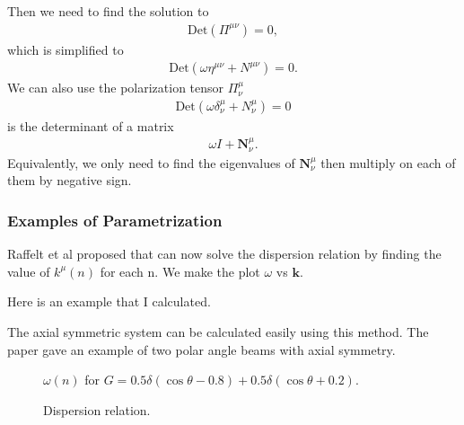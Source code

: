 \documentclass[letterpaper,12pt,english]{sphinxmanual}
\begin{document}
Then we need to find the solution to
\begin{equation*}
\begin{split}\mathrm{Det}(\Pi^{\mu\nu})=0,\end{split}
\end{equation*}
which is simplified to
\begin{equation*}
\begin{split}\mathrm{Det}(\omega \eta^{\mu\nu} + N^{\mu\nu}) = 0.\end{split}
\end{equation*}
We can also use the polarization tensor \(\Pi^\mu_\nu\)
\begin{equation*}
\begin{split}\mathrm{Det}(\omega \delta^\mu_\nu + N^{\mu}_\nu) =0\end{split}
\end{equation*}
is the determinant of a matrix
\begin{equation*}
\begin{split}\omega I + \mathbf N^\mu_\nu.\end{split}
\end{equation*}
Equivalently, we only need to find the eigenvalues of \(\mathbf N^\mu_\nu\) then multiply on each of them by negative sign.


\subsubsection{Examples of Parametrization}
\label{\detokenize{collective/dispersion-relation:examples-of-parametrization}}
Raffelt et al proposed that can now solve the dispersion relation by finding the value of \(k^\mu(n)\) for each n. We make the plot \(\omega\) vs \(\mathbf k\).

Here is an example that I calculated.

The axial symmetric system can be calculated easily using this method. The paper gave an example of two polar angle beams with axial symmetry.
\begin{figure}[htbp]
\centering
\capstart

\noindent{}
\caption{\(\omega(n)\) for \(G=0.5 \delta(\cos\theta- 0.8) + 0.5 \delta(\cos\theta+0.2)\).}\label{\detokenize{collective/dispersion-relation:id2}}\end{figure}
\begin{figure}[htbp]
\centering
\capstart

\noindent{}
\caption{Dispersion relation.}\label{\detokenize{collective/dispersion-relation:id3}}\end{figure}
\end{document}
